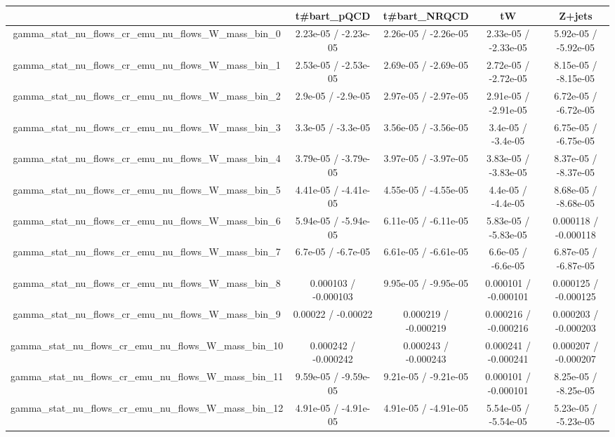 \documentclass[10pt]{article}
\begin{document}
\begin{table}[htbp]
\begin{center}
\begin{tabular}{|c|c|c|c|c|}
\hline 
      & t#bar{t}_{pQCD}      & t#bar{t}_{NRQCD}      & tW      & Z+jets \\ 
\hline 
  gamma_stat_nu_flows_cr_emu_nu_flows_W_mass_bin_0 & 2.23e-05 / -2.23e-05 & 2.26e-05 / -2.26e-05 & 2.33e-05 / -2.33e-05 & 5.92e-05 / -5.92e-05 \\ 
  gamma_stat_nu_flows_cr_emu_nu_flows_W_mass_bin_1 & 2.53e-05 / -2.53e-05 & 2.69e-05 / -2.69e-05 & 2.72e-05 / -2.72e-05 & 8.15e-05 / -8.15e-05 \\ 
  gamma_stat_nu_flows_cr_emu_nu_flows_W_mass_bin_2 & 2.9e-05 / -2.9e-05 & 2.97e-05 / -2.97e-05 & 2.91e-05 / -2.91e-05 & 6.72e-05 / -6.72e-05 \\ 
  gamma_stat_nu_flows_cr_emu_nu_flows_W_mass_bin_3 & 3.3e-05 / -3.3e-05 & 3.56e-05 / -3.56e-05 & 3.4e-05 / -3.4e-05 & 6.75e-05 / -6.75e-05 \\ 
  gamma_stat_nu_flows_cr_emu_nu_flows_W_mass_bin_4 & 3.79e-05 / -3.79e-05 & 3.97e-05 / -3.97e-05 & 3.83e-05 / -3.83e-05 & 8.37e-05 / -8.37e-05 \\ 
  gamma_stat_nu_flows_cr_emu_nu_flows_W_mass_bin_5 & 4.41e-05 / -4.41e-05 & 4.55e-05 / -4.55e-05 & 4.4e-05 / -4.4e-05 & 8.68e-05 / -8.68e-05 \\ 
  gamma_stat_nu_flows_cr_emu_nu_flows_W_mass_bin_6 & 5.94e-05 / -5.94e-05 & 6.11e-05 / -6.11e-05 & 5.83e-05 / -5.83e-05 & 0.000118 / -0.000118 \\ 
  gamma_stat_nu_flows_cr_emu_nu_flows_W_mass_bin_7 & 6.7e-05 / -6.7e-05 & 6.61e-05 / -6.61e-05 & 6.6e-05 / -6.6e-05 & 6.87e-05 / -6.87e-05 \\ 
  gamma_stat_nu_flows_cr_emu_nu_flows_W_mass_bin_8 & 0.000103 / -0.000103 & 9.95e-05 / -9.95e-05 & 0.000101 / -0.000101 & 0.000125 / -0.000125 \\ 
  gamma_stat_nu_flows_cr_emu_nu_flows_W_mass_bin_9 & 0.00022 / -0.00022 & 0.000219 / -0.000219 & 0.000216 / -0.000216 & 0.000203 / -0.000203 \\ 
  gamma_stat_nu_flows_cr_emu_nu_flows_W_mass_bin_10 & 0.000242 / -0.000242 & 0.000243 / -0.000243 & 0.000241 / -0.000241 & 0.000207 / -0.000207 \\ 
  gamma_stat_nu_flows_cr_emu_nu_flows_W_mass_bin_11 & 9.59e-05 / -9.59e-05 & 9.21e-05 / -9.21e-05 & 0.000101 / -0.000101 & 8.25e-05 / -8.25e-05 \\ 
  gamma_stat_nu_flows_cr_emu_nu_flows_W_mass_bin_12 & 4.91e-05 / -4.91e-05 & 4.91e-05 / -4.91e-05 & 5.54e-05 / -5.54e-05 & 5.23e-05 / -5.23e-05 \\ 

\end{tabular}
\end{center}
\end{table}
\end{document}
